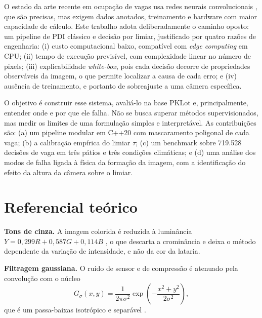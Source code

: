 \documentclass[
	article,			%
	11pt,				%
	oneside,			%
	a4paper,			%
	english,			%
	brazil,				%
	sumario=tradicional
	]{abntex2}
\begin{document}
O estado da arte recente em ocupação de vagas usa redes neurais convolucionais \cite{amato2017deep}, que são precisas, mas exigem dados anotados, treinamento e hardware com maior capacidade de cálculo. Este trabalho adota deliberadamente o caminho oposto: um pipeline de PDI clássico e decisão por limiar, justificado por quatro razões de engenharia: (i) custo computacional baixo, compatível com \textit{edge computing} em CPU; (ii) tempo de execução previsível, com complexidade linear no número de pixels; (iii) explicabilidade \textit{white-box}, pois cada decisão decorre de propriedades observáveis da imagem, o que permite localizar a causa de cada erro; e (iv) ausência de treinamento, e portanto de sobreajuste a uma câmera específica.

O objetivo é construir esse sistema, avaliá-lo na base PKLot e, principalmente, entender onde e por que ele falha. Não se busca superar métodos supervisionados, mas medir os limites de uma formulação simples e interpretável. As contribuições são: (a) um pipeline modular em C++20 com mascaramento poligonal de cada vaga; (b) a calibração empírica do limiar $\tau$; (c) um benchmark sobre 719.528 decisões de vaga em três pátios e três condições climáticas; e (d) uma análise dos modos de falha ligada à física da formação da imagem, com a identificação do efeito da altura da câmera sobre o limiar.

\section{Referencial teórico}

\textbf{Tons de cinza.} A imagem colorida é reduzida à luminância $Y = 0{,}299R + 0{,}587G + 0{,}114B$ \cite{gonzalez2010pdi}, o que descarta a crominância e deixa o método dependente da variação de intensidade, e não da cor da lataria.

\textbf{Filtragem gaussiana.} O ruído de sensor e de compressão é atenuado pela convolução com o núcleo
\begin{equation}
G_\sigma(x,y)=\frac{1}{2\pi\sigma^{2}}\exp\!\left(-\frac{x^{2}+y^{2}}{2\sigma^{2}}\right),
\end{equation}
que é um passa-baixas isotrópico e separável \cite{gonzalez2010pdi}.
\end{document}
